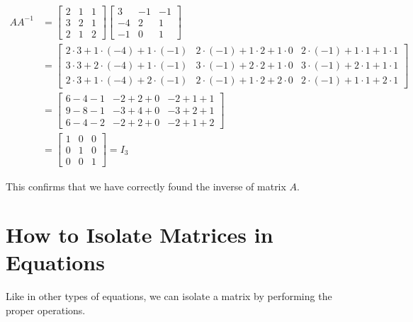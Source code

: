 \begin{align*}
    AA^{-1} & =
    \begin{bmatrix}
        2 & 1 & 1 \\
        3 & 2 & 1 \\
        2 & 1 & 2
    \end{bmatrix}
    \begin{bmatrix}
        3  & -1 & -1 \\
        -4 & 2  & 1  \\
        -1 & 0  & 1
    \end{bmatrix}                                                                                                        \\
            & =
    \begin{bmatrix}
        2 \cdot 3 + 1 \cdot (-4) + 1 \cdot (-1) & 2 \cdot (-1) + 1 \cdot 2 + 1 \cdot 0 & 2 \cdot (-1) + 1 \cdot 1 + 1 \cdot 1 \\
        3 \cdot 3 + 2 \cdot (-4) + 1 \cdot (-1) & 3 \cdot (-1) + 2 \cdot 2 + 1 \cdot 0 & 3 \cdot (-1) + 2 \cdot 1 + 1 \cdot 1 \\
        2 \cdot 3 + 1 \cdot (-4) + 2 \cdot (-1) & 2 \cdot (-1) + 1 \cdot 2 + 2 \cdot 0 & 2 \cdot (-1) + 1 \cdot 1 + 2 \cdot 1
    \end{bmatrix} \\
            & =
    \begin{bmatrix}
        6 - 4 - 1 & -2 + 2 + 0 & -2 + 1 + 1 \\
        9 - 8 - 1 & -3 + 4 + 0 & -3 + 2 + 1 \\
        6 - 4 - 2 & -2 + 2 + 0 & -2 + 1 + 2
    \end{bmatrix}                                                                                   \\
            & =
    \begin{bmatrix}
        1 & 0 & 0 \\
        0 & 1 & 0 \\
        0 & 0 & 1
    \end{bmatrix} = I_3
\end{align*}

This confirms that we have correctly found the inverse of matrix \(A\).

\section{How to Isolate Matrices in Equations}

Like in other types of equations, we can isolate a matrix by performing the proper operations.

